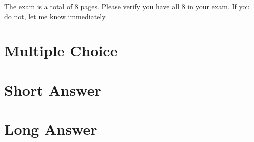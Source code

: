 \documentclass[15pt]{article}
\begin{document}
\vspace{0.25in}

The exam is a total of 8 pages.
Please verify you have all 8 in your exam. 
If you do not, let me know immediately.

\newpage


\section*{Multiple Choice}



\newpage

\section*{Short Answer}


\vspace{5cm}


\vspace{5cm}

\newpage


\vspace{5cm}


\vspace{5cm}

\newpage

\newpage

\section*{Long Answer}



\newpage



\newpage


\end{document}
